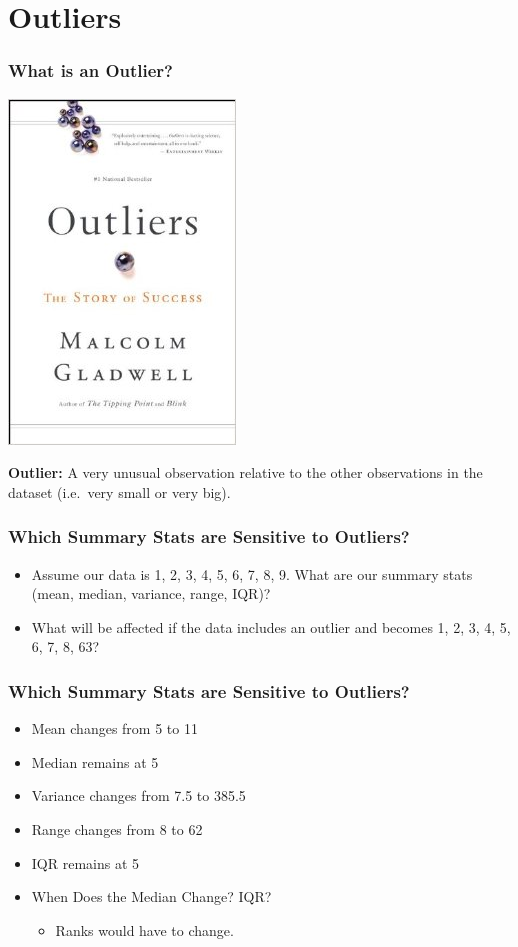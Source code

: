 \documentclass{beamer}
\begin{document}
\section{Outliers}
\begin{frame}
\frametitle{What is an Outlier?}
	\begin{center}
		\includegraphics[scale = 0.4]{./images/outliers.jpg}
	\end{center}
	\centering
	\textbf{Outlier:} A very unusual observation relative to the other observations in the dataset 		(i.e.\ very small or very big).
\end{frame}

\begin{frame}
\frametitle{Which Summary Stats are Sensitive to Outliers?}
	\begin{itemize}
		\item Assume our data is 1, 2, 3, 4, 5, 6, 7, 8, 9. What are our summary stats (mean, median, variance, 			range, IQR)?
		\item What will be affected if the data includes an outlier and becomes 1, 2, 3, 4, 5, 6, 7, 8, 63?
	\end{itemize}
\end{frame}

\begin{frame}
\frametitle{Which Summary Stats are Sensitive to Outliers?}
	\begin{itemize}[<+->]
		\item Mean changes from 5 to 11
		\item Median remains at 5
		\item Variance changes from 7.5 to 385.5
		\item Range changes from 8 to 62
		\item IQR remains at 5
		\item \alert{When Does the Median Change? IQR?}
		\begin{itemize}
			\item Ranks would have to change.
		\end{itemize}
	\end{itemize}
\end{frame}
\end{document}
